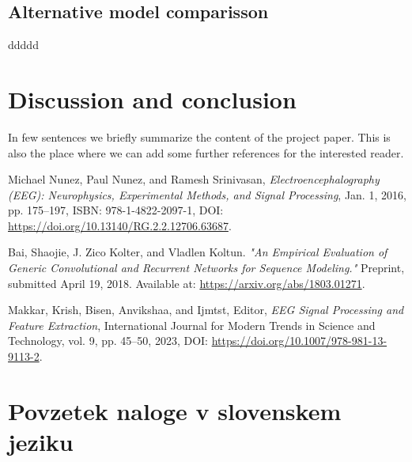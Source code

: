 \documentclass[12pt,a4paper,titlepage,openany]{report}
\begin{document}
\section{Alternative model comparisson}


ddddd




\chapter{Discussion and conclusion}
\thispagestyle{fancy}

In few sentences we briefly summarize the content of the project paper.
This is also the place where we can add some further references for the interested reader.


\begin{thebibliography}{99}
\thispagestyle{fancy}
     
     Michael Nunez, Paul Nunez, and Ramesh Srinivasan, 
     \emph{Electroencephalography (EEG): Neurophysics, Experimental Methods, and Signal Processing}, 
     Jan. 1, 2016, pp. 175--197, ISBN: 978-1-4822-2097-1, DOI: \url{https://doi.org/10.13140/RG.2.2.12706.63687}.

     Bai, Shaojie, J. Zico Kolter, and Vladlen Koltun. 
     \emph{"An Empirical Evaluation of Generic Convolutional and Recurrent Networks for Sequence Modeling."} 
     Preprint, submitted April 19, 2018. Available at: \url{https://arxiv.org/abs/1803.01271}.
     
     Makkar, Krish, Bisen, Anvikshaa, and Ijmtst, Editor, 
     \emph{EEG Signal Processing and Feature Extraction}, 
     International Journal for Modern Trends in Science and Technology, vol. 9, pp. 45--50, 2023, 
     DOI: \url{https://doi.org/10.1007/978-981-13-9113-2}.   
    
     
\end{thebibliography}
\newpage


\chapter{Povzetek naloge v slovenskem jeziku}
\thispagestyle{fancy}
\end{document}
